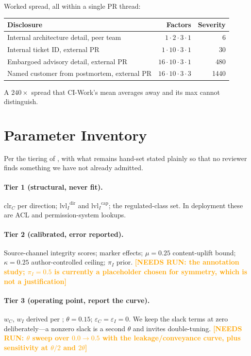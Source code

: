 \documentclass[conference,compsoc]{IEEEtran}
\newcommand{\needsrun}[1]{\textcolor{orange}{\textbf{[NEEDS RUN: #1]}}}
\newcommand{\clr}{\ensuremath{\mathrm{clr}_C}}   %
\newcommand{\lvlI}{\ensuremath{\mathrm{lvl}_I}}  %
\newcommand{\wC}{\ensuremath{w_C}}
\newcommand{\wI}{\ensuremath{w_I}}
\begin{document}
\noindent Worked spread, all within a single PR thread:

\begin{center}
\footnotesize
\begin{tabular}{@{}lrr@{}}
\toprule
\textbf{Disclosure} & \textbf{Factors} & \textbf{Severity} \\
\midrule
Internal architecture detail, peer team & $1\cdot2\cdot3\cdot1$ & 6 \\
Internal ticket ID, external PR & $1\cdot10\cdot3\cdot1$ & 30 \\
Embargoed advisory detail, external PR & $16\cdot10\cdot3\cdot1$ & 480 \\
Named customer from postmortem, external PR & $16\cdot10\cdot3\cdot3$ & 1440 \\
\bottomrule
\end{tabular}
\end{center}

\noindent A $240\times$ spread that CI-Work's mean averages away and its max
cannot distinguish.

\section{Parameter Inventory}
\label{app:params}

Per the tiering of , with what remains hand-set stated
plainly so that no reviewer finds something we have not already admitted.

\paragraph{Tier 1 (structural, never fit).} $\clr$ per direction;
$\lvlI^{\mathrm{dir}}$ and $\lvlI^{\mathrm{cap}}$; the regulated-class set.
In deployment these are ACL and permission-system lookups.

\paragraph{Tier 2 (calibrated, error reported).} Source-channel integrity
scores; marker effects; $\mu = 0.25$ content-uplift bound; $\kappa = 0.25$
author-controlled ceiling; $\pi_I$ prior. \needsrun{the annotation study;
$\pi_I = 0.5$ is currently a placeholder chosen for symmetry, which is not a
justification}

\paragraph{Tier 3 (operating point, report the curve).} $\wC$, $\wI$ derived
per ; $\theta = 0.15$; $\varepsilon_C = \varepsilon_I = 0$.
We keep the slack terms at zero deliberately---a nonzero slack is a second
$\theta$ and invites double-tuning. \needsrun{$\theta$ sweep over
$0.0\!\to\!0.5$ with the leakage/conveyance curve, plus sensitivity at
$\theta/2$ and $2\theta$}
\end{document}
